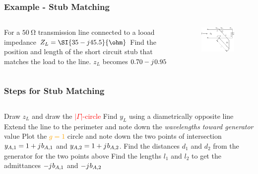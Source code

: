\documentclass[10pt, compress]{beamer}
\renewcommand{\j}{{j}\mkern1mu} %
\begin{document}
\begin{frame}
    \frametitle{Example - Stub Matching}
    \begin{columns}[]
        \begin{column}[]{.5\textwidth}
            \begin{outline}
                \1 For a $\SI{50}{\ohm}$ transmission line connected to a looad impedance $Z_L = \SI{35 - j 45.5}{\ohm}$
                \1 Find the position and length of the short circuit stub that matches the load to the line.
                \1 $z_L$ becomes $0.70 - \j 0.95$
            \end{outline}  
        \end{column}
        \begin{column}[]{.5\textwidth}
            \begin{figure}[]
                \centering
                \includegraphics[width=.9\textwidth]{tline_single_stub.pdf}
            \end{figure}
        \end{column}
    \end{columns}
\end{frame}

\begin{frame}
    \frametitle{Steps for Stub Matching}
    \begin{columns}[]
        \begin{column}[]{1\textwidth}
            \begin{outline}[enumerate]
                \1 Draw $z_L$ and draw the \textcolor{red}{$|\Gamma|$-circle}
                \1 Find $y_L$ using a diametrically  opposite line
                \1 Extend the line to the perimeter and note down the \textit{wavelengths toward generator} value
                \1 Plot the \textcolor{orange}{$g =1 $} circle and note down the two points of intersection $y_{A,1} = 1 + \j b_{A,1}$ and $y_{A,2} = 1 + \j b_{A,2}$.
                \1 Find the distances $d_1$ and $d_2$ from the generator for the two points above
                \1 Find the lengths $l_1$ and $l_2$ to get the admittances $ - \j b_{A,1}$ and $ - \j b_{A,2}$
            \end{outline}  
        \end{column}
    \end{columns}
\end{frame}
\end{document}

